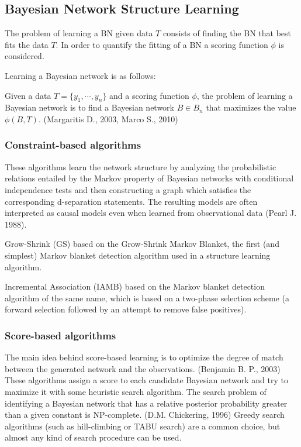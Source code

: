 \documentclass[runningheads,a4paper]{llncs}
\begin{document}
\subsection{Bayesian Network Structure Learning}

The problem of learning a BN given data $T$ consists of finding the BN that best fits the data $T$. In order to quantify the fitting of a BN a scoring function $\phi$ is considered.

Learning a Bayesian network is as follows:

Given a data $T = \{y_{1}, \cdots, y_{n}\}$ and a scoring function $\phi$, the problem of learning a Bayesian network is to find a Bayesian network $B \in B_{n}$ that maximizes the value $\phi(B, T)$. {\scriptsize{}(Margaritis D., 2003, Marco S., 2010)}




\subsubsection{Constraint-based algorithms}

These algorithms learn the network structure by analyzing the probabilistic relations entailed by the Markov property of Bayesian networks with conditional independence tests and then constructing a graph which satisfies the corresponding d-separation statements. The resulting models are often interpreted as causal models even when learned from observational data {\scriptsize{}(Pearl J. 1988)}.

Grow-Shrink (GS) based on the Grow-Shrink Markov Blanket, the first (and simplest) Markov blanket detection algorithm used in a structure learning algorithm.
	
Incremental Association (IAMB) based on the Markov blanket detection algorithm of the same name, which is based on a two-phase selection scheme (a forward selection followed by an attempt to remove false positives).



\subsubsection{Score-based algorithms}

The main idea behind score-based learning is to optimize the degree of match between the generated network and the observations. {\scriptsize{}(Benjamin B. P., 2003)} These algorithms assign a score to each candidate Bayesian network and try to maximize it with some heuristic search algorithm. The search problem of identifying a Bayesian network that has a relative posterior probability greater than a given constant is NP-complete. {\scriptsize{}(D.M. Chickering, 1996)} Greedy search algorithms (such as hill-climbing or TABU search) are a common choice, but almost any kind of search procedure can be used.
\end{document}
